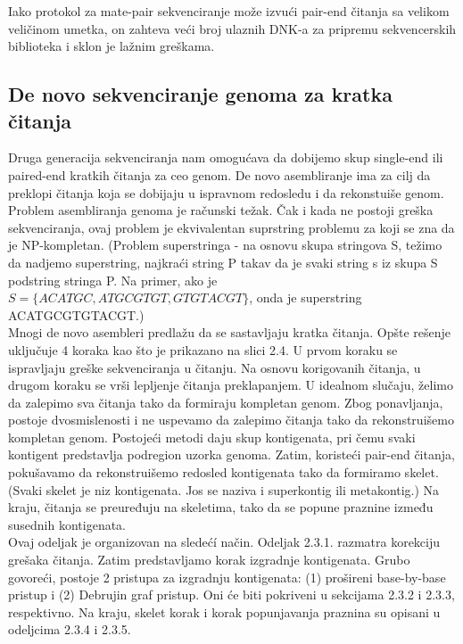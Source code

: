 \documentclass{article}
\begin{document}
Iako protokol za mate-pair sekvenciranje može izvući pair-end čitanja sa velikom veličinom umetka, on zahteva veći broj ulaznih DNK-a za pripremu sekvencerskih biblioteka i sklon je lažnim greškama.

\subsection{De novo sekvenciranje genoma za kratka čitanja}

Druga generacija sekvenciranja nam omogućava da dobijemo skup single-end ili paired-end kratkih čitanja za ceo genom. De novo asembliranje ima za cilj da preklopi čitanja koja se dobijaju u ispravnom redosledu i da rekonstuiše genom.\\


Problem asembliranja genoma je računski težak. Čak i kada ne postoji greška sekvenciranja, ovaj problem je ekvivalentan suprstring problemu za koji se zna da je NP-kompletan. (Problem superstringa - na osnovu skupa stringova S, težimo da nadjemo superstring, najkraći string P takav da je svaki string s iz skupa S podstring stringa P. Na primer, ako je $S = \{ACATGC, ATGCGTGT, GTGTACGT\}$, onda je superstring ACATGCGTGTACGT.) \\

Mnogi de novo asembleri predlažu da se sastavljaju kratka čitanja. Opšte rešenje uključuje 4 koraka kao što je prikazano na slici 2.4. U prvom koraku se ispravljaju greške sekvenciranja u čitanju. Na osnovu korigovanih čitanja, u drugom koraku se vrši lepljenje čitanja preklapanjem. U idealnom slučaju, želimo da zalepimo sva čitanja tako da formiraju kompletan genom. Zbog ponavljanja, postoje dvosmislenosti i ne uspevamo da zalepimo čitanja tako da rekonstruišemo kompletan genom. Postojeći metodi daju skup kontigenata, pri čemu svaki kontigent predstavlja podregion uzorka genoma. Zatim, koristeći pair-end čitanja, pokušavamo da rekonstruišemo redosled kontigenata tako da formiramo skelet.(Svaki skelet je niz kontigenata. Jos se naziva i superkontig ili metakontig.) Na kraju, čitanja se preuređuju na skeletima, tako da se popune praznine između susednih kontigenata.\\

Ovaj odeljak je organizovan na sledećí način. Odeljak 2.3.1. razmatra korekciju grešaka čitanja. Zatim predstavljamo korak izgradnje kontigenata. Grubo govoreći, postoje 2 pristupa za izgradnju kontigenata: (1) prošireni base-by-base pristup i (2) Debrujin graf pristup. Oni će biti pokriveni u sekcijama 2.3.2 i 2.3.3, respektivno. Na kraju, skelet korak i korak popunjavanja praznina su opisani u odeljcima 2.3.4 i 2.3.5.\\
\end{document}
